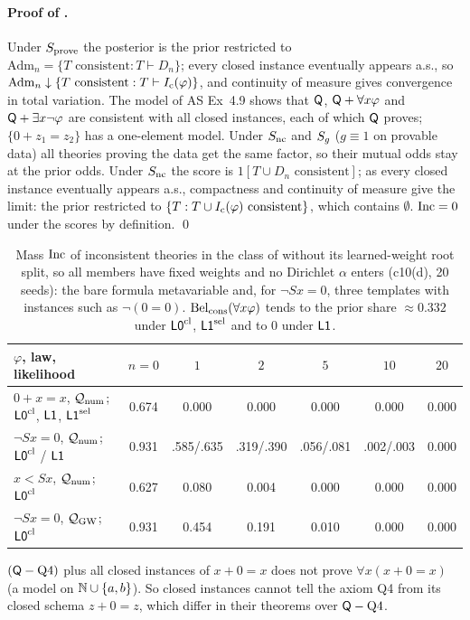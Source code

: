 \paragraph{Proof of .} Under $S_{\mathrm{prove}}$ the posterior is the prior restricted to $\mathrm{Adm}_n=\{T\text{ consistent}:T\vdash D_n\}$; every closed instance eventually appears a.s., so $\mathrm{Adm}_n\downarrow\{T\text{ consistent}:T\vdash I_{\mathrm{c}}(\varphi)\}$, and continuity of measure gives convergence in total variation. The model of AS Ex~4.9 shows that $\mathsf{Q}$, $\mathsf{Q}+\forall x\varphi$ and $\mathsf{Q}+\exists x\neg\varphi$ are consistent with all closed instances, each of which $\mathsf{Q}$ proves; $\{0+z_1=z_2\}$ has a one-element model. Under $S_{\mathrm{nc}}$ and $S_{g}$ ($g\equiv1$ on provable data) all theories proving the data get the same factor, so their mutual odds stay at the prior odds. Under $S_{\mathrm{nc}}$ the score is $1[T\cup D_n\text{ consistent}]$; as every closed instance eventually appears a.s., compactness and continuity of measure give the limit: the prior restricted to $\{T:T\cup I_{\mathrm{c}}(\varphi)\text{ consistent}\}$, which contains $\emptyset$. $\mathrm{Inc}=0$ under the scores by definition. \qed

\begin{table}[ht]
\centering\small
\begin{tabular}{@{}lcccccc@{}}
\toprule
$\varphi$, law, likelihood & $n=0$ & $1$ & $2$ & $5$ & $10$ & $20$\\
\midrule
$0+x=x$, $\mathcal{Q}_{\mathrm{num}}$; $\mathord{\mathsf{L0}}^{\mathrm{cl}}$, $\mathord{\mathsf{L1}}$, $\mathord{\mathsf{L1}}^{\mathrm{sel}}$ & 0.674 & 0.000 & 0.000 & 0.000 & 0.000 & 0.000\\
$\neg Sx=0$, $\mathcal{Q}_{\mathrm{num}}$; $\mathord{\mathsf{L0}}^{\mathrm{cl}}$ / $\mathord{\mathsf{L1}}$ & 0.931 & .585/.635 & .319/.390 & .056/.081 & .002/.003 & 0.000\\
$x<Sx$, $\mathcal{Q}_{\mathrm{num}}$; $\mathord{\mathsf{L0}}^{\mathrm{cl}}$ & 0.627 & 0.080 & 0.004 & 0.000 & 0.000 & 0.000\\
$\neg Sx=0$, $\mathcal{Q}_{\mathrm{GW}}$; $\mathord{\mathsf{L0}}^{\mathrm{cl}}$ & 0.931 & 0.454 & 0.191 & 0.010 & 0.000 & 0.000\\
\bottomrule
\end{tabular}
\caption{Mass $\mathrm{Inc}$ of inconsistent theories in the class of  without its learned-weight root split, so all members have fixed weights and no Dirichlet $\alpha$ enters (c10(d), 20 seeds): the bare formula metavariable and, for $\neg Sx=0$, three templates with instances such as $\neg(0=0)$. $\mathrm{Bel}_{\mathrm{cons}}(\forall x\varphi)$ tends to the prior share $\approx0.332$ under $\mathord{\mathsf{L0}}^{\mathrm{cl}}$, $\mathord{\mathsf{L1}}^{\mathrm{sel}}$ and to $0$ under $\mathord{\mathsf{L1}}$.}
\label{tab:univ:inc}
\end{table}

\begin{proposition}\label{prop:univ:q4}
$(\mathsf{Q}-\text{Q4})$ plus all closed instances of $x+0=x$ does not prove $\forall x(x+0=x)$ (a model on $\mathbb{N}\cup\{a,b\}$). So closed instances cannot tell the axiom Q4 from its closed schema $z+0=z$, which differ in their theorems over $\mathsf{Q}-\text{Q4}$.
\end{proposition}

